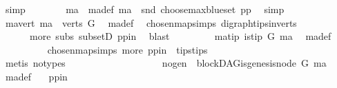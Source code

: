 \begin{isabellebody}
\ simp\isanewline
\ \ \ \ \ \ \isamarkupfalse%
\ ma\ \ ma{\isacharunderscore}{\kern0pt}def{\isacharcolon}{\kern0pt}\ {\isachardoublequoteopen}ma\ {\isacharequal}{\kern0pt}\ {\isacharparenleft}{\kern0pt}snd\ {\isacharparenleft}{\kern0pt}choose{\isacharunderscore}{\kern0pt}max{\isacharunderscore}{\kern0pt}blue{\isacharunderscore}{\kern0pt}set\ pp{\isacharparenright}{\kern0pt}{\isacharparenright}{\kern0pt}{\isachardoublequoteclose}\ \isamarkupfalse%
\ simp\isanewline
\ \ \ \ \ \ \isamarkupfalse%
\ ma{\isacharunderscore}{\kern0pt}vert{\isacharcolon}{\kern0pt}\ {\isachardoublequoteopen}ma\ {\isasymin}\ verts\ G{\isachardoublequoteclose}\ \isamarkupfalse%
\ ma{\isacharunderscore}{\kern0pt}def\ \isamarkupfalse%
\ chosen{\isacharunderscore}{\kern0pt}map{\isacharunderscore}{\kern0pt}simps{\isacharparenleft}{\kern0pt}{}{\isacharparenright}{\kern0pt}\ digraph{\isachardot}{\kern0pt}tips{\isacharunderscore}{\kern0pt}in{\isacharunderscore}{\kern0pt}verts\isanewline
\ \ \ \ \ \ more{\isacharparenleft}{\kern0pt}{}{\isacharparenright}{\kern0pt}\ subs\ subsetD\ pp{\isacharunderscore}{\kern0pt}in\ \isamarkupfalse%
\ blast\ \isanewline
\ \ \ \ \ \ \isamarkupfalse%
\ ma{\isacharunderscore}{\kern0pt}tip{\isacharcolon}{\kern0pt}\ {\isachardoublequoteopen}is{\isacharunderscore}{\kern0pt}tip\ G\ ma{\isachardoublequoteclose}\ \isamarkupfalse%
\ ma{\isacharunderscore}{\kern0pt}def\isanewline
\ \ \ \ \ \ \ \ \isamarkupfalse%
\ chosen{\isacharunderscore}{\kern0pt}map{\isacharunderscore}{\kern0pt}simps{\isacharparenleft}{\kern0pt}{}{\isacharparenright}{\kern0pt}\ more\ pp{\isacharunderscore}{\kern0pt}in\ \ tips{\isacharunderscore}{\kern0pt}tips\isanewline
\ \ \ \ \ \ \ \ \ \ \isamarkupfalse%
\ {\isacharparenleft}{\kern0pt}metis\ {\isacharparenleft}{\kern0pt}no{\isacharunderscore}{\kern0pt}types{\isacharparenright}{\kern0pt}{\isacharparenright}{\kern0pt}\ \ \ \ \ \ \ \ \ \ \isanewline
\ \ \ \ \ \ \isamarkupfalse%
\ \isamarkupfalse%
\ no{\isacharunderscore}{\kern0pt}gen{\isacharcolon}{\kern0pt}\ {\isachardoublequoteopen}{\isasymnot}\ blockDAG{\isachardot}{\kern0pt}is{\isacharunderscore}{\kern0pt}genesis{\isacharunderscore}{\kern0pt}node\ G\ ma{\isachardoublequoteclose}\ \isamarkupfalse%
\ ma{\isacharunderscore}{\kern0pt}def\ \ \isamarkupfalse%
\ pp{\isacharunderscore}{\kern0pt}in\ \isanewline

\end{isabellebody}
